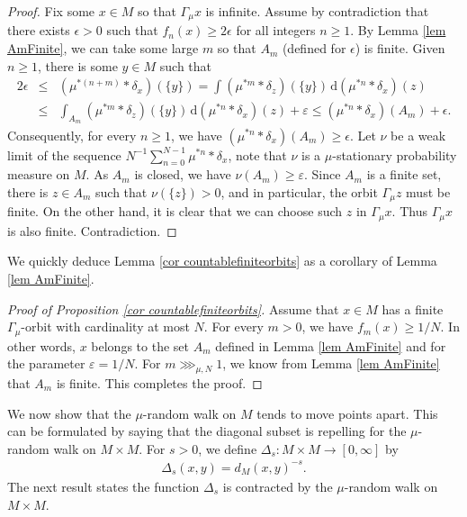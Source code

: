 \documentclass[11pt, leqno, fleqn]{amsart}
\def\eps{\varepsilon}
\newcommand{\margem}[1]{\marginpar{{\scriptsize {#1}}}}
\def\clo{   \color{orange}}
\newcommand{\dd}{\,\mathrm{d}}
\newcommand{\aryst}{\begin{eqnarray*}}
\newcommand{\earyst}{\end{eqnarray*}}
\theoremstyle{definition}
\theoremstyle{definition}
\begin{document}
\begin{proof}
	Fix some $x \in M$ so that $\Gamma_{\mu} x$ is infinite.
	Assume by contradiction that there exists $\epsilon > 0$  such that $ f_n(x) \geq 2 \epsilon$ for all integers $n \geq1$.   
	 By Lemma \ref{lem AmFinite}, we can take some large $m$ so that $A_m$ (defined for $\epsilon$) is finite. 
		Given $n \geq 1$, there is some $y \in M$ such that   
			\aryst
	2 \epsilon &\leq&	 	(\mu^{*(n + m)}* \delta_x)(\{ y \})  = \int ( \mu^{*m} * \delta_{z})(\{y\})   \dd(\mu^{*n}* \delta_x)(z) \\
	&\leq&  \int_{A_m} ( \mu^{*m} * \delta_{z})(\{y\})   \dd(\mu^{*n}* \delta_x)(z) + \eps \leq (\mu^{* n } * \delta_x)(A_m) + \epsilon.
	\earyst
	Consequently, for every $n \geq 1$, we have $(\mu^{* n } * \delta_x)(A_m) \geq \epsilon$. Let $\nu$ be a weak limit  of the sequence $N^{-1} \sum_{n = 0}^{N-1} \mu^{*n} * \delta_{x}$, note that $\nu$ is a $\mu$-stationary probability measure on $M$. As $A_{m}$ is closed, we have  $\nu(A_m)\geq \eps$.  Since $A_m$ is a finite set, there is $z \in A_m$ such that $\nu(\{z\}) > 0$, and in particular, the orbit $\Gamma_{\mu} z$ must be finite. On the other hand, it is clear that we can choose such $z$ in  $\Gamma_{\mu} x$. Thus $\Gamma_{\mu} x$ is also finite. Contradiction. 
\end{proof}

 

We quickly deduce Lemma \ref{cor countablefiniteorbits} as a corollary of Lemma \ref{lem AmFinite}.

\begin{proof}[Proof of Proposition \ref{cor countablefiniteorbits}]
	Assume that $x \in M$ has a finite $\Gamma_{\mu}$-orbit with cardinality at most $N$.  For every  $m > 0$, we have $f_m(x) \geq 1/N$. In other words, $x$ belongs to the set $A_m$ defined  in Lemma \ref{lem AmFinite} and for the parameter $\eps=1/N$. For $m \ggg_{ \mu, N} 1$, we know from Lemma \ref{lem AmFinite} that $A_m$ is finite. This completes the proof.
\end{proof}

 
 
We now show that the $\mu$-random walk on $M$ tends to move points apart. This can be formulated by saying that the diagonal subset is repelling for the $\mu$-random walk on $M\times M$.  
For $s > 0$, we define $\Delta_s : M \times M \to [0,\infty]$ by 
\aryst
\Delta_s(x, y) = d_M(x, y)^{-s}.
\earyst
The next result states the function $\Delta_{s}$ is contracted by the $\mu$-random walk on $M\times M$. 
\end{document}

